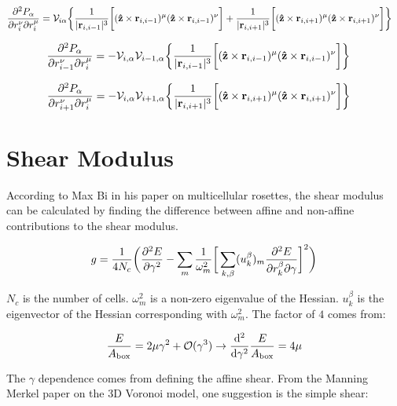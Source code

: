 \documentclass[12pt,a4paper]{article}
\begin{document}
\begin{align}
	\pdv[2]{P_\alpha}{r_i^\nu}{r_i^\mu} &= \mathcal{V}_{i\alpha}\bigg\{ \frac{1}{|\vb{r}_{i,i-1}|^3}\bigg[(\vu{z}\times \vb{r}_{i,i-1})^{\mu}(\vu{z}\times \vb{r}_{i,i-1})^{\nu} \bigg] + \frac{1}{|\vb{r}_{i,i+1}|^3}\bigg[(\vu{z}\times \vb{r}_{i,i+1})^{\mu}(\vu{z}\times \vb{r}_{i,i+1})^{\nu} \bigg] \bigg\}
\end{align}

\begin{align}
	\pdv[2]{P_\alpha}{r_{i-1}^\nu}{r_i^\mu} &= -\mathcal{V}_{i,\alpha} \mathcal{V}_{i-1,\alpha}\bigg\{\frac{1}{|\vb{r}_{i,i-1}|^3}\bigg[(\vu{z}\times \vb{r}_{i,i-1})^{\mu}(\vu{z}\times \vb{r}_{i,i-1})^{\nu} \bigg]\bigg\}
\end{align}

\begin{align}
	\pdv[2]{P_\alpha}{r_{i+1}^\nu}{r_i^\mu} &= -\mathcal{V}_{i,\alpha} \mathcal{V}_{i+1,\alpha}\bigg\{\frac{1}{|\vb{r}_{i,i+1}|^3}\bigg[(\vu{z}\times \vb{r}_{i,i+1})^{\mu}(\vu{z}\times \vb{r}_{i,i+1})^{\nu} \bigg]\bigg\}
\end{align}
\section{Shear Modulus }

According to Max Bi in his paper on multicellular rosettes, the shear modulus can be calculated by finding the difference between affine and non-affine contributions to the shear modulus.

\begin{equation}
\label{eqn: shearmodulus}
g = \frac{1}{4 N_c}\bigg(\pdv[2]{E}{\gamma} - \sum\limits_{m} \frac{1}{\omega_m^2}\bigg[\sum\limits_{k,\beta}(u_k^\beta)_m \pdv{E}{r_k^\beta}{\gamma} \bigg]^2\bigg)
\end{equation}

$N_c$ is the number of cells. $\omega_m^2$ is a non-zero eigenvalue of the Hessian. $u_k^\beta$ is the eigenvector of the Hessian corresponding with $\omega_m^2$. The factor of $4$ comes from:

\begin{equation}
	\frac{E}{A_{\text{box}}} = 2 \mu \gamma^2 + \mathcal{O}(\gamma^3) \rightarrow \dv[2]{\gamma} \frac{E}{A_{\text{box}}} = 4 \mu 
\end{equation}

The $\gamma$ dependence comes from defining the affine shear. From the Manning Merkel paper on the 3D Voronoi model, one suggestion is the simple shear:
\end{document}
